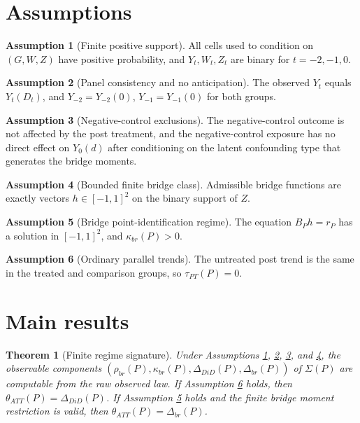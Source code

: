 \documentclass[11pt]{article}
\theoremstyle{definition}
\newtheorem{assumption}{Assumption}
\theoremstyle{plain}
\newtheorem{theorem}{Theorem}
\theoremstyle{remark}
\begin{document}
\section{Assumptions}
\begin{assumption}[Finite positive support]\label{ass:finite-positive}
All cells used to condition on \((G,W,Z)\) have positive probability, and \(Y_t,W_t,Z_t\) are binary for \(t=-2,-1,0\).
\end{assumption}

\begin{assumption}[Panel consistency and no anticipation]\label{ass:consistency}
The observed \(Y_t\) equals \(Y_t(D_t)\), and \(Y_{-2}=Y_{-2}(0)\), \(Y_{-1}=Y_{-1}(0)\) for both groups.
\end{assumption}

\begin{assumption}[Negative-control exclusions]\label{ass:nc-exclusion}
The negative-control outcome is not affected by the post treatment, and the negative-control exposure has no direct effect on \(Y_0(d)\) after conditioning on the latent confounding type that generates the bridge moments.
\end{assumption}

\begin{assumption}[Bounded finite bridge class]\label{ass:bounded-bridge}
Admissible bridge functions are exactly vectors \(h\in[-1,1]^2\) on the binary support of \(Z\).
\end{assumption}

\begin{assumption}[Bridge point-identification regime]\label{ass:bridge-point}
The equation \(B_P h=r_P\) has a solution in \([-1,1]^2\), and \(\kappa_{br}(P)>0\).
\end{assumption}

\begin{assumption}[Ordinary parallel trends]\label{ass:parallel-trends}
The untreated post trend is the same in the treated and comparison groups, so \(\tau_{PT}(P)=0\).
\end{assumption}

\section{Main results}
\begin{theorem}[Finite regime signature]
Under Assumptions \ref{ass:finite-positive}, \ref{ass:consistency}, \ref{ass:nc-exclusion}, and \ref{ass:bounded-bridge}, the observable components \((\rho_{br}(P),\kappa_{br}(P),\Delta_{DiD}(P),\Delta_{br}(P))\) of \(\Sigma(P)\) are computable from the raw observed law. If Assumption \ref{ass:parallel-trends} holds, then \(\theta_{ATT}(P)=\Delta_{DiD}(P)\). If Assumption \ref{ass:bridge-point} holds and the finite bridge moment restriction is valid, then \(\theta_{ATT}(P)=\Delta_{br}(P)\).
\end{theorem}
\end{document}
